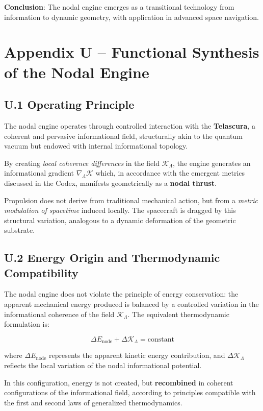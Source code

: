 \documentclass[12pt]{article}
\begin{document}
\textbf{Conclusion}: The nodal engine emerges as a transitional technology from information to dynamic geometry, with application in advanced space navigation.

\section*{Appendix U – Functional Synthesis of the Nodal Engine}

\subsection*{U.1 Operating Principle}

The nodal engine operates through controlled interaction with the \textbf{Telascura}, a coherent and pervasive informational field, structurally akin to the quantum vacuum but endowed with internal informational topology.

By creating \emph{local coherence differences} in the field $\mathcal{K}_\Lambda$, the engine generates an informational gradient $\nabla_\Lambda \mathcal{K}$ which, in accordance with the emergent metrics discussed in the Codex, manifests geometrically as a \textbf{nodal thrust}.

Propulsion does not derive from traditional mechanical action, but from a \emph{metric modulation of spacetime} induced locally. The spacecraft is dragged by this structural variation, analogous to a dynamic deformation of the geometric substrate.

\subsection*{U.2 Energy Origin and Thermodynamic Compatibility}

The nodal engine does not violate the principle of energy conservation: the apparent mechanical energy produced is balanced by a controlled variation in the informational coherence of the field $\mathcal{K}_\Lambda$. The equivalent thermodynamic formulation is:

\[
\Delta E_{\text{node}} + \Delta \mathcal{K}_\Lambda = \text{constant}
\]

where $\Delta E_{\text{node}}$ represents the apparent kinetic energy contribution, and $\Delta \mathcal{K}_\Lambda$ reflects the local variation of the nodal informational potential.

In this configuration, energy is not created, but \textbf{recombined} in coherent configurations of the informational field, according to principles compatible with the first and second laws of generalized thermodynamics.
\end{document}

